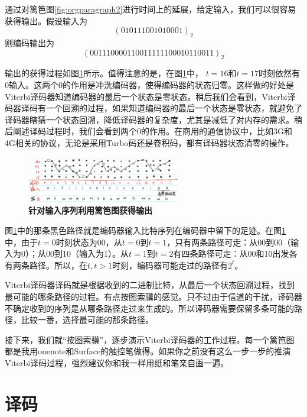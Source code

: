 \documentclass[10pt,a4paper,UTF8]{article}
\begin{document}
通过对篱笆图\ref{fig:orgparagraph2}进行时间上的延展，给定输入，我们可以很容易获得输出。假设输入为
\begin{equation}
\label{eq:1}
(010111001010001)_{2}
\end{equation}
则编码输出为
\begin{equation}
\label{eq:2}
(001110000110011111100010110011)_{2}
\end{equation}

输出的获得过程如图\ref{fig:orgparagraph3}所示。值得注意的是，在图\ref{fig:orgparagraph3}中， \(t=16\)和\(t=17\)时刻依然有0输入。这两个0的作用是冲洗编码器，使得编码器的状态归零。这样做的好处是Viterbi译码器知道编码器的最后一个状态是零状态。稍后我们会看到，Viterbi译码器译码有一个回溯的过程，如果知道编码器的最后一个状态是零状态，就避免了译码器瞎猜一个状态回溯，降低译码器的复杂度，尤其是减低了对内存的需求。稍后阐述译码过程时，我们会看到两个0的作用。在商用的通信协议中，比如3G和4G相关的协议，无论是采用Turbo码还是卷积码，都有译码器状态清零的操作。

\begin{figure}[htb]
\centering
\includegraphics[width=0.6\textwidth]{../../img/20160101convolutionalEncoderTrellisOutput1.jpg}
\caption{\label{fig:orgparagraph3}
\textbf{针对输入序列利用篱笆图获得输出}}
\end{figure}

图\ref{fig:orgparagraph3}中的那条黑色路径就是编码器输入比特序列在编码器中留下的足迹。在图\ref{fig:orgparagraph3} 中，由于\(t=0\)时刻状态为00，从\(t=0\)到\(t=1\)，只有两条路径可走：从00到00（输入为0）；从00到10（输入为1）。从\(t=1\)到\(t=2\)有四条路径可走：从00和10出发各有两条路径。所以，在\(t,t>1\)时刻，编码器可能走过的路径有\(2^t\)。

Viterbi译码器译码就是根据收到的二进制比特，从最后一个状态回溯过程，找到最可能的哪条路径的过程。有点按图索骥的感觉。只不过由于信道的干扰，译码器不确定收到的序列是从哪条路径走过来生成的。所以译码器需要保留多条可能的路径，比较一番，选择最可能的那条路径。

接下来，我们就“按图索骥”，逐步演示Viterbi译码器的工作过程。每一个篱笆图都是我用onenote和Surface的触控笔做得。如果你之前没有这么一步一步的推演Viterbi译码过程，强烈建议你和我一样用纸和笔亲自画一遍。

\section{译码}
\label{sec:orgheadline3}
\end{document}

